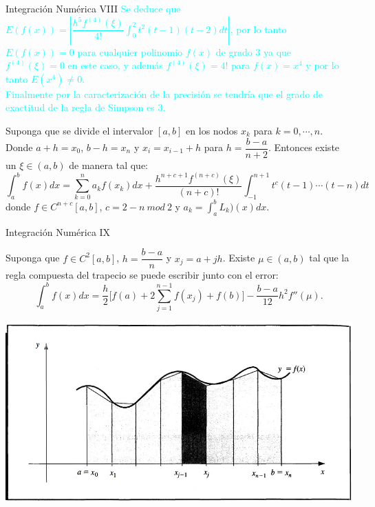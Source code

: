 \begin{frame}{Integración Numérica VIII}
\small
\textcolor{cyan}{Se deduce que $E(f(x))=|\dfrac{h^{5}f^{(4)}(\xi)}{4!}\int_{0}^{2}t^2(t-1)(t-2)dt|$, por lo tanto $E(f(x))=0$ para cualquier polinomio $f(x)$ de grado 3 ya que $f^{(4)}(\xi)=0$ en este caso, y además $f^{(4)}(\xi)=4!$ para $f(x)=x^4$ y por lo tanto $E(x^4)\neq 0$.}\\
\textcolor{cyan}{Finalmente por la caracterización de la precisión se tendría que el grado de exactitud de la regla de Simpson es 3.}\pause
\begin{Teo}
Suponga que se divide el intervalor $[a,b]$ en los nodos $x_k$ para $k=0,\cdots, n$. Donde $a+h=x_0$, $b-h=x_n$ y $x_i=x_{i-1}+h$ para $h=\dfrac{b-a}{n+2}$. Entonces existe un $\xi\in(a,b)$ de manera tal que:
$$\int_a^b f(x)dx=\sum_{k=0}^{n}a_kf(x_k)dx+\dfrac{h^{n+c+1}f^{(n+c)}(\xi)}{(n+c)!}\int_{-1}^{n+1}t^c(t-1)\cdots(t-n)dt$$
donde $f\in C^{n+c}[a,b]$, $c=2-n\ mod\ 2$ y $\displaystyle a_k=\int_{a}^{b}L_k)(x)dx$.
\end{Teo}
\end{frame}
\begin{frame}{Integración Numérica IX}
\begin{Teo}
Suponga que $f\in C^2[a,b]$, $h=\dfrac{b-a}{n}$ y $x_j=a+jh$. Existe $\mu\in(a,b)$ tal que la regla compuesta del trapecio se puede escribir junto con el error:
$$\int_{a}^{b}f(x)dx=\dfrac{h}{2}\bigg[ 	f(a)+2\sum_{j=1}^{n-1}f(x_j)+f(b)\bigg]-\dfrac{b-a}{12}h^2f''(\mu).$$
\end{Teo}
\centering
\includegraphics[scale=0.5]{Imagen12}
\end{frame}
